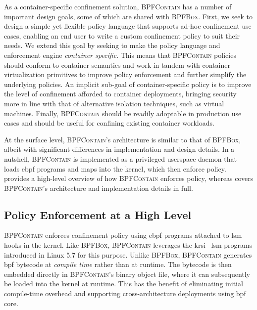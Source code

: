 \documentclass[
  fontsize=12pt,
  titlepage=firstiscover,
  paper=letter,
oneside,
  cleardoublepage=plain,
  parskip=half-,
  DIV=10,
  parindent,
  appendixprefix,
  chapterprefix,
  listof=totoc,
]{scrbook}
\newcommand{\bpfbox}{\textsc{BPFBox}}
\newcommand{\bpfcontain}{\textsc{BPFContain}}
\begin{document}
As a container-specific confinement solution, \bpfcontain{} has a number of important
design goals, some of which are shared with \bpfbox{}. First, we seek to design a simple
yet flexible policy language that supports ad-hoc confinement use cases, enabling an
end user to write a custom confinement policy to suit their needs. We extend this goal by
seeking to make the policy language and enforcement engine \textit{container specific}.
This means that \bpfcontain{} policies should conform to container semantics and work in
tandem with container virtualization primitives to improve policy enforcement and further
simplify the underlying policies. An implicit sub-goal of container-specific policy is to
improve the level of confinement afforded to container deployments, bringing security more
in line with that of alternative isolation techniques, such as virtual machines. Finally,
\bpfcontain{} should be readily adoptable in production use cases and should be useful for
confining existing container workloads.

At the surface level, \bpfcontain{}'s architecture is similar to that of \bpfbox{}, albeit
with significant differences in implementation and design details. In a nutshell,
\bpfcontain{} is implemented as a privileged userspace daemon that loads \gls{ebpf}
programs and maps into the kernel, which then enforce policy.
 provides a high-level overview of how
\bpfcontain{} enforces policy, whereas  covers
\bpfcontain{}'s architecture and implementation details in full.

\subsection{Policy Enforcement at a High Level}\label{ss:bpfcontain-enforcement-overview}

\bpfcontain{} enforces confinement policy using \gls{ebpf} programs attached to \gls{lsm}
hooks in the kernel. Like \bpfbox{}, \bpfcontain{} leverages the
\gls{krsi}~\cite{singh2019_krsi} \gls{lsm} programs introduced in Linux 5.7 for this
purpose. Unlike \bpfbox{}, \bpfcontain{} generates \gls{bpf} bytecode at
\textit{compile time} rather than at runtime. The bytecode is then embedded directly in
\bpfcontain{}'s binary object file, where it can subsequently be loaded into the kernel at
runtime. This has the benefit of eliminating initial compile-time overhead and supporting
cross-architecture deployments using \gls{bpf} \gls{core}.
\end{document}
